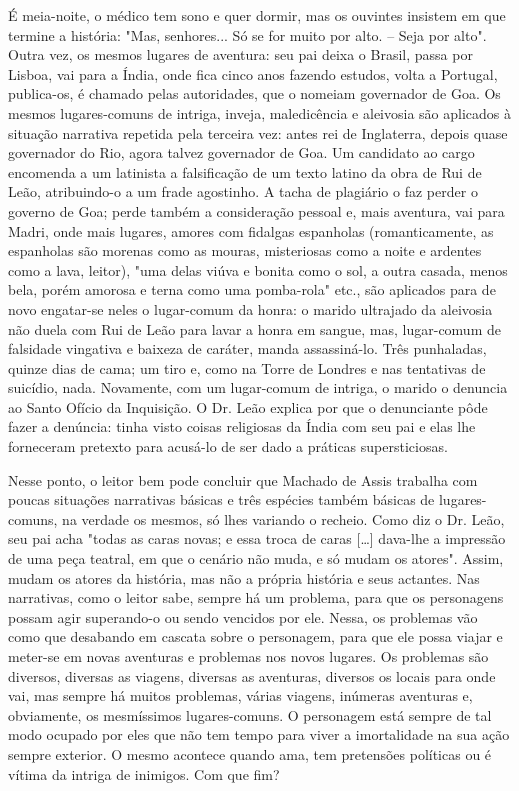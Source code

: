 É meia-noite, o médico tem sono e quer dormir, mas os ouvintes insistem
em que termine a história: "Mas, senhores... Só se for muito por alto.
-- Seja por alto". Outra vez, os mesmos lugares de aventura: seu pai
deixa o Brasil, passa por Lisboa, vai para a Índia, onde fica cinco anos
fazendo estudos, volta a Portugal, publica-os, é chamado pelas
autoridades, que o nomeiam governador de Goa. Os mesmos lugares-comuns
de intriga, inveja, maledicência e aleivosia são aplicados à situação
narrativa repetida pela terceira vez: antes rei de Inglaterra, depois
quase governador do Rio, agora talvez governador de Goa. Um candidato ao
cargo encomenda a um latinista a falsificação de um texto latino da obra
de Rui de Leão, atribuindo-o a um frade agostinho. A tacha de plagiário
o faz perder o governo de Goa; perde também a consideração pessoal e,
mais aventura, vai para Madri, onde mais lugares, amores com fidalgas
espanholas (romanticamente, as espanholas são morenas como as mouras,
misteriosas como a noite e ardentes como a lava, leitor), "uma delas
viúva e bonita como o sol, a outra casada, menos bela, porém amorosa e
terna como uma pomba-rola" etc., são aplicados para de novo engatar-se
neles o lugar-comum da honra: o marido ultrajado da aleivosia não duela
com Rui de Leão para lavar a honra em sangue, mas, lugar-comum de
falsidade vingativa e baixeza de caráter, manda assassiná-lo. Três
punhaladas, quinze dias de cama; um tiro e, como na Torre de Londres e
nas tentativas de suicídio, nada. Novamente, com um lugar-comum de
intriga, o marido o denuncia ao Santo Ofício da Inquisição. O Dr. Leão
explica por que o denunciante pôde fazer a denúncia: tinha visto coisas
religiosas da Índia com seu pai e elas lhe forneceram pretexto para
acusá-lo de ser dado a práticas supersticiosas.

Nesse ponto, o leitor bem pode concluir que Machado de Assis trabalha
com poucas situações narrativas básicas e três espécies também básicas
de lugares-comuns, na verdade os mesmos, só lhes variando o recheio.
Como diz o Dr. Leão, seu pai acha "todas as caras novas; e essa troca de
caras {[}\ldots{}{]} dava-lhe a impressão de uma peça teatral, em que o
cenário não muda, e só mudam os atores". Assim, mudam os atores da
história, mas não a própria história e seus actantes. Nas narrativas,
como o leitor sabe, sempre há um problema, para que os personagens
possam agir superando-o ou sendo vencidos por ele. Nessa, os problemas
vão como que desabando em cascata sobre o personagem, para que ele possa
viajar e meter-se em novas aventuras e problemas nos novos lugares. Os
problemas são diversos, diversas as viagens, diversas as aventuras,
diversos os locais para onde vai, mas sempre há muitos problemas, várias
viagens, inúmeras aventuras e, obviamente, os mesmíssimos
lugares-comuns. O personagem está sempre de tal modo ocupado por eles
que não tem tempo para viver a imortalidade na sua ação sempre exterior.
O mesmo acontece quando ama, tem pretensões políticas ou é vítima da
intriga de inimigos. Com que fim?

